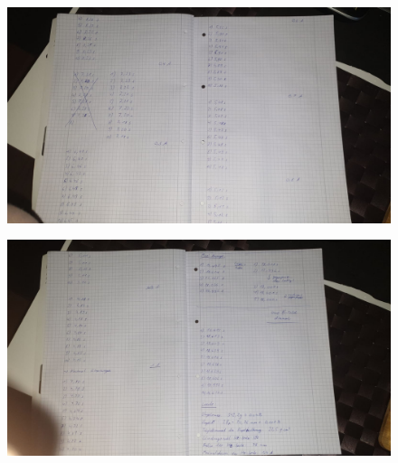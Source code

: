 \begin{figure}
    \centering
    \includegraphics[scale=0.1]{content/Bilder/daten2.jpg}
\end{figure}

\begin{figure}
    \centering
    \includegraphics[scale=0.1]{content/Bilder/daten3.jpg}
\end{figure}

